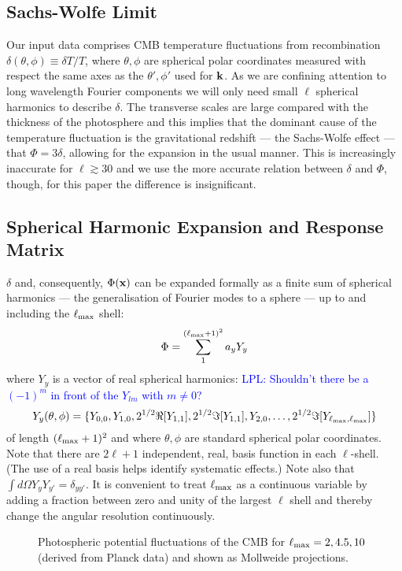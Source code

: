 \documentclass[useAMS,usenatbib,a4paper]{mn2e}
\begin{document}
\subsection{Sachs-Wolfe Limit}

Our input data comprises CMB temperature fluctuations from
recombination $\delta(\theta,\phi)\equiv\delta T/T$, where
$\theta,\phi$ are spherical polar coordinates measured with respect
the same axes as the $\theta',\phi'$ used for $\bf k$. As we are
confining attention to long wavelength Fourier components we will only
need small $\ell$ spherical harmonics to describe $\delta$. The
transverse scales are large compared with the thickness of the
photosphere and this implies that the dominant cause of the
temperature fluctuation is the gravitational redshift --- the
Sachs-Wolfe effect --- that $\Phi=3\delta$, allowing for the expansion
in the usual manner. This is increasingly inaccurate for
$\ell\gtrsim30$ and we use the more accurate relation between $\delta$
and $\Phi$, though, for this paper the difference is insignificant.

\subsection{Spherical Harmonic Expansion and Response Matrix}

$\delta$ and, consequently, $\Phi({\bf x})$ can be expanded formally
as a finite sum of spherical harmonics --- the generalisation of
Fourier modes to a sphere --- up to and including the $\ell_{\rm max}$
shell:
\begin{equation}
\Phi=\sum_1^{(\ell_{\rm max}+1)^2}a_yY_y
\end{equation}
where $Y_y$ is a vector of real spherical harmonics:
\textcolor{blue}{LPL: Shouldn't there be a $(-1)^{m}$ in front of the $Y_{lm}$ with $m\neq0$?}
\begin{equation}
Y_y(\theta,\phi)=\{Y_{0,0},Y_{1,0},2^{1/2}\Re[Y_{1,1}],2^{1/2}\Im[Y_{1,1}],Y_{2,0},\dots,2^{1/2}\Im[Y_{\ell_{\rm max},\ell_{\rm max}}]\}
\end{equation}
of length $(\ell_{\rm max}+1)^2$ and where $\theta,\phi$ are standard spherical polar coordinates. Note that there are $2\ell+1$ independent, real, basis function in each $\ell$-shell. (The use of a real basis helps identify systematic effects.) Note also that $\int d\Omega Y_yY_{y'}=\delta_{yy'}$. It is convenient to treat $\ell_{\rm max}$ as a continuous variable by adding a fraction between zero and unity of the largest $\ell$ shell and thereby change the angular resolution continuously.
\begin{figure}[t]
\centering
\caption{{\small Photospheric potential fluctuations of the CMB for $\ell_{\rm max}=2,4.5,10$ (derived from Planck data) and shown as Mollweide projections.}}
\end{figure}
\end{document}
